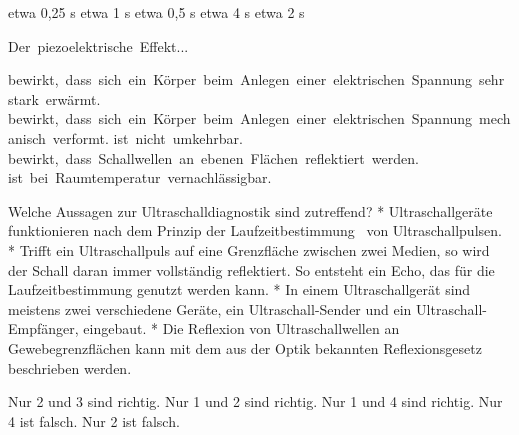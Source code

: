 \documentclass[11pt]{exam}
\begin{document}
\begin{questions}
\begin{choices}
	\choice etwa 0,25 s
	\choice etwa 1 s
	\choice etwa 0,5 s
	\choice etwa 4 s
	\choice etwa 2 s
\end{choices}

\vspace{3mm}\question Der piezoelektrische Effekt...

\begin{choices}
	\choice bewirkt, dass sich ein Körper beim Anlegen einer elektrischen Spannung sehr stark erwärmt.
	\choice bewirkt, dass sich ein Körper beim Anlegen einer elektrischen Spannung mechanisch verformt.
	\choice ist nicht umkehrbar.
	\choice bewirkt, dass Schallwellen an ebenen Flächen reflektiert werden.
	\choice ist bei Raumtemperatur vernachlässigbar.
\end{choices}

\vspace{3mm}\question Welche Aussagen zur Ultraschalldiagnostik sind zutreffend?	* Ultraschallgeräte funktionieren nach dem Prinzip der Laufzeitbestimmung  von Ultraschallpulsen.	* Trifft ein Ultraschallpuls auf eine Grenzfläche zwischen zwei Medien, so wird der Schall daran immer vollständig reflektiert. So entsteht ein Echo, das für die Laufzeitbestimmung genutzt werden kann.	* In einem Ultraschallgerät sind meistens zwei verschiedene Geräte, ein Ultraschall-Sender und ein Ultraschall-Empfänger, eingebaut.	* Die Reflexion von Ultraschallwellen an Gewebegrenzflächen kann mit dem aus der Optik bekannten Reflexionsgesetz beschrieben werden.

\begin{choices}
	\choice Nur 2 und 3 sind richtig.
	\choice Nur 1 und 2 sind richtig.
	\choice Nur 1 und 4 sind richtig.
	\choice Nur 4 ist falsch.
	\choice Nur 2 ist falsch.
\end{choices}

\vspace{3mm}\end{questions}
\end{document}
